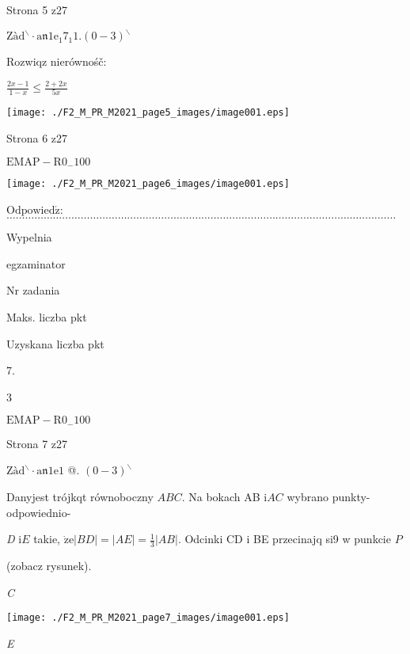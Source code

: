 \documentclass[a4paper,12pt]{article}
\begin{document}
Strona 5 z27





$\mathrm{Z}\text{à} \mathrm{d}^{\backslash }\cdot \mathrm{a}\mathfrak{n}1\mathrm{e}_{1}7_{1}1. (0-3)^{\backslash }$

Rozwiqz nierównośč:

$\displaystyle \frac{2x-1}{1-x}\leq\frac{2+2x}{5x}$
\begin{center}
\texttt{[image: ./F2\_M\_PR\_M2021\_page5\_images/image001.eps]}
\end{center}
Strona 6 z27

$\mathrm{E}\mathrm{M}\mathrm{A}\mathrm{P}-\mathrm{R}0_{-}100$




\begin{center}
\texttt{[image: ./F2\_M\_PR\_M2021\_page6\_images/image001.eps]}
\end{center}
$\mathrm{O}\mathrm{d}\mathrm{p}\mathrm{o}\mathrm{w}\mathrm{i}\mathrm{e}\mathrm{d}\acute{\mathrm{z}}$:$\ldots\ldots\ldots\ldots\ldots\ldots\ldots\ldots\ldots\ldots\ldots\ldots\ldots\ldots\ldots\ldots\ldots\ldots\ldots\ldots\ldots\ldots\ldots\ldots\ldots\ldots\ldots\ldots\ldots\ldots\ldots\ldots\ldots\ldots\ldots\ldots\ldots\ldots\ldots\ldots\ldots\ldots$

Wypelnia

egzaminator

Nr zadania

Maks. liczba pkt

Uzyskana liczba pkt

7.

3

$\mathrm{E}\mathrm{M}\mathrm{A}\mathrm{P}-\mathrm{R}0_{-}100$

Strona 7 z27





$\mathrm{Z}\text{à} \mathrm{d}^{\backslash }\cdot \mathrm{a}\mathfrak{n}1\mathrm{e}1$ @. $(0-3)^{\backslash }$

Danyjest trójkqt równoboczny $ABC$. Na bokach AB $\mathrm{i} AC$ wybrano punkty- odpowiednio-

{\it D} $\mathrm{i} E$ takie, $\dot{\mathrm{z}}\mathrm{e} |BD| = |AE| =\displaystyle \frac{1}{3}|AB|$. Odcinki CD $\mathrm{i}$ BE przecinajq si9 w punkcie $P$

(zobacz rysunek).

{\it C}
\begin{center}
\texttt{[image: ./F2\_M\_PR\_M2021\_page7\_images/image001.eps]}
\end{center}
{\it E}
\end{document}
